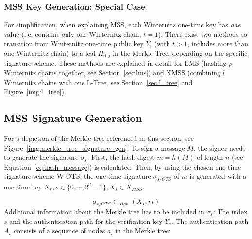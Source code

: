 \subsubsection{MSS Key Generation: Special Case}
\label{sec:mss_special_keygen}
For simplification, when explaining MSS, each Winternitz one-time key has \textit{one} value (i.e. contains only one Winternitz chain, $t = 1$). There exist two methods to transition from Winternitz one-time public key $Y_i$ (with $t > 1$, includes more than one Winternitz chain) to a leaf $H_{0,j}$ in the Merkle Tree, depending on the specific signature scheme. 
These methods are explained in detail for LMS (hashing $p$ Winternitz chains together, see Section~\ref{sec:lms}) and XMSS (combining $l$ Winternitz chains with one L-Tree, see Section~\ref{sec:l_tree} and Figure~\ref{img:l_tree}). %

\subsection{MSS Signature Generation}
\label{sec:mss_sig_gen}
For a depiction of the Merkle tree referenced in this section, see Figure~\ref{img:merkle_tree_signature_gen}. 
To sign a message $M$, the signer needs to generate the signature $\sigma_s$.
First, the hash digest $m = h(M)$ of length $n$ (see Equation~\ref{eq:hash_message}) is calculated. Then, by using the chosen one-time signature scheme W-OTS, the one-time signature $\sigma_{s/OTS}$ of $m$ is generated with a one-time key $X_s, s \in \{0, \cdots, 2^d - 1\}, X_s \in X_{MSS}$. %

\begin{equation}
\label{eq:merkle_s/OTS_signature}
\sigma_{s/OTS} \leftarrow_{sign} (X_s, m) 
\end{equation}
Additional information about the Merkle tree has to be included in $\sigma_s$: The index $s$ and the authentication path for the verification key $Y_s$. The authentication path $A_s$ consists of a sequence of nodes $a_i$ in the Merkle tree:

